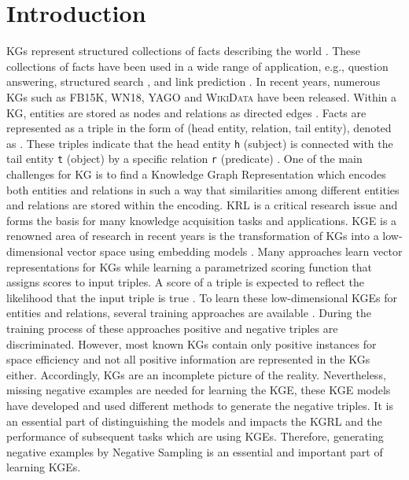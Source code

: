 \chapter{Introduction}
\label{ch:introduction}


\acp{KG} represent structured collections of facts describing the world   \cite{hogan2020knowledge}.
These collections of facts have been used in a wide range of application, e.g., question answering, structured search \cite{zhang2019nscaching}, and link prediction \cite{cai2017kbgan, Alam2020AffinityDN}.
In recent years, numerous \acp{KG} such as \textsc{FB15K}, \textsc{WN18}, \textsc{YAGO} \cite{ConEx} and \textsc{WikiData} \cite{arnaoutwikinegata} have been released.
Within a \ac{KG}, entities are stored as nodes and relations as directed edges \cite{zhang2019nscaching}.
Facts are represented as a triple in the form of (head entity, relation, tail entity), denoted as .
These triples indicate that the head entity \texttt{h} (subject) is connected with the tail entity \texttt{t} (object) by a specific relation \texttt{r} (predicate) \cite{zhang2019nscaching, Alam2020AffinityDN}.
One of the main challenges for \ac{KG} is to find a Knowledge Graph Representation which encodes both entities and relations in such a way that similarities among different entities and relations are stored within the encoding. 
\ac{KRL} is a critical research issue and forms the basis for many knowledge acquisition tasks and applications.
\ac{KGE} is a renowned area of research in recent years is the transformation of \acp{KG} into a low-dimensional vector space using embedding models \cite{Alam2020AffinityDN}.
Many approaches learn vector representations for \acp{KG} while learning a parametrized scoring function that assigns scores to input triples.
A score of a triple is expected to reflect the likelihood that the input triple is true \cite{ConvE, qiannegative}.
To learn these low-dimensional \acp{KGE} for entities and relations, several training approaches are available \cite{Ruffinelli2020You}.
During the training process of these approaches positive and negative triples are discriminated.
However, most known \acp{KG} contain only positive instances for space efficiency \cite{qiannegative} and not all positive information are represented in the \acp{KG} either.
Accordingly, \acp{KG} are an incomplete picture of the reality.
Nevertheless, missing negative examples are needed for learning the \ac{KGE}, these \ac{KGE} models have developed and used different methods to generate the negative triples.
It is an essential part of distinguishing the models \cite{Ruffinelli2020You} and impacts the \ac{KGRL} and the performance of subsequent tasks which are using \acp{KGE}. 
Therefore, generating negative examples by Negative Sampling is an essential and important part of learning \acp{KGE}.


